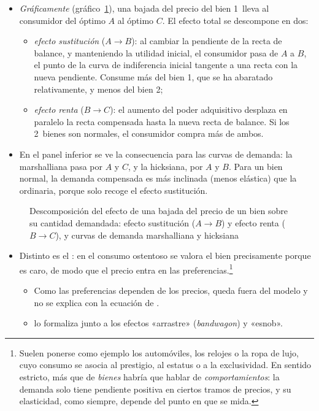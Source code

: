 \documentclass[11pt]{article}
\begin{document}
\begin{itemize}
\item \emph{Gráficamente} (gráfico~\ref{fig:efecto-sustitucion-renta}), una bajada del precio del bien 1~lleva al consumidor del óptimo $A$ al óptimo $C$. El efecto total se descompone en dos:
  \begin{itemize}
  \item \emph{efecto sustitución} ($A\rightarrow B$): al cambiar la pendiente de la recta de balance, y manteniendo la utilidad inicial, el consumidor pasa de $A$ a $B$, el punto de la curva de indiferencia inicial tangente a una recta con la nueva pendiente. Consume más del bien 1, que se ha abaratado relativamente, y menos del bien 2;
  \item \emph{efecto renta} ($B\rightarrow C$): el aumento del poder adquisitivo desplaza en paralelo la recta compensada hasta la nueva recta de balance. Si los 2~bienes son normales, el consumidor compra más de ambos.
  \end{itemize}
\item En el panel inferior se ve la consecuencia para las curvas de demanda: la marshalliana pasa por $A$ y $C$, y la hicksiana, por $A$ y $B$. Para un bien normal, la demanda compensada es más inclinada (menos elástica) que la ordinaria, porque solo recoge el efecto sustitución.
\end{itemize}

\begin{figure}[H]
\centering
\caption{Descomposición del efecto de una bajada del precio de un bien sobre su cantidad demandada: efecto sustitución ($A\rightarrow B$) y efecto renta ($B\rightarrow C$), y curvas de demanda marshalliana y hicksiana}\label{fig:efecto-sustitucion-renta}
\end{figure}

\begin{itemize}
\item Distinto es el : en el consumo ostentoso se valora el bien precisamente porque es caro, de modo que el precio entra en las preferencias\nocite{Veblen1899Leisure}.\footnote{Suelen ponerse como ejemplo los automóviles, los relojes o la ropa de lujo, cuyo consumo se asocia al prestigio, al estatus o a la exclusividad. En sentido estricto, más que de \emph{bienes}  habría que hablar de \emph{comportamientos}: la demanda solo tiene pendiente positiva en ciertos tramos de precios, y su elasticidad, como siempre, depende del punto en que se mida.}
  \begin{itemize}
  \item Como las preferencias dependen de los precios, queda fuera del modelo y no se explica con la ecuación de .
  \item \textcite{Leibenstein1950Bandwagon} lo formaliza junto a los efectos «arrastre» (\emph{bandwagon}) y «esnob».
  \end{itemize}
\end{itemize}
\end{document}
